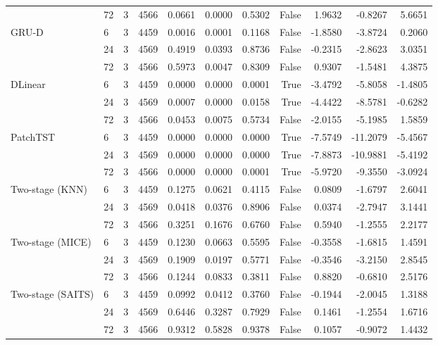\begin{table}
\begin{tabular}{llrrrrrrrrr}
 & 72 & 3 & 4566 & 0.0661 & 0.0000 & 0.5302 & False & 1.9632 & -0.8267 & 5.6651 \\
\cline{1-11}
\multirow[t]{3}{*}{GRU-D} & 6 & 3 & 4459 & 0.0016 & 0.0001 & 0.1168 & False & -1.8580 & -3.8724 & 0.2060 \\
 & 24 & 3 & 4569 & 0.4919 & 0.0393 & 0.8736 & False & -0.2315 & -2.8623 & 3.0351 \\
 & 72 & 3 & 4566 & 0.5973 & 0.0047 & 0.8309 & False & 0.9307 & -1.5481 & 4.3875 \\
\cline{1-11}
\multirow[t]{3}{*}{DLinear} & 6 & 3 & 4459 & 0.0000 & 0.0000 & 0.0001 & True & -3.4792 & -5.8058 & -1.4805 \\
 & 24 & 3 & 4569 & 0.0007 & 0.0000 & 0.0158 & True & -4.4422 & -8.5781 & -0.6282 \\
 & 72 & 3 & 4566 & 0.0453 & 0.0075 & 0.5734 & False & -2.0155 & -5.1985 & 1.5859 \\
\cline{1-11}
\multirow[t]{3}{*}{PatchTST} & 6 & 3 & 4459 & 0.0000 & 0.0000 & 0.0000 & True & -7.5749 & -11.2079 & -5.4567 \\
 & 24 & 3 & 4569 & 0.0000 & 0.0000 & 0.0000 & True & -7.8873 & -10.9881 & -5.4192 \\
 & 72 & 3 & 4566 & 0.0000 & 0.0000 & 0.0001 & True & -5.9720 & -9.3550 & -3.0924 \\
\cline{1-11}
\multirow[t]{3}{*}{Two-stage (KNN)} & 6 & 3 & 4459 & 0.1275 & 0.0621 & 0.4115 & False & 0.0809 & -1.6797 & 2.6041 \\
 & 24 & 3 & 4569 & 0.0418 & 0.0376 & 0.8906 & False & 0.0374 & -2.7947 & 3.1441 \\
 & 72 & 3 & 4566 & 0.3251 & 0.1676 & 0.6760 & False & 0.5940 & -1.2555 & 2.2177 \\
\cline{1-11}
\multirow[t]{3}{*}{Two-stage (MICE)} & 6 & 3 & 4459 & 0.1230 & 0.0663 & 0.5595 & False & -0.3558 & -1.6815 & 1.4591 \\
 & 24 & 3 & 4569 & 0.1909 & 0.0197 & 0.5771 & False & -0.3546 & -3.2150 & 2.8545 \\
 & 72 & 3 & 4566 & 0.1244 & 0.0833 & 0.3811 & False & 0.8820 & -0.6810 & 2.5176 \\
\cline{1-11}
\multirow[t]{3}{*}{Two-stage (SAITS)} & 6 & 3 & 4459 & 0.0992 & 0.0412 & 0.3760 & False & -0.1944 & -2.0045 & 1.3188 \\
 & 24 & 3 & 4569 & 0.6446 & 0.3287 & 0.7929 & False & 0.1461 & -1.2554 & 1.6716 \\
 & 72 & 3 & 4566 & 0.9312 & 0.5828 & 0.9378 & False & 0.1057 & -0.9072 & 1.4432 \\

\end{tabular}
\end{table}
